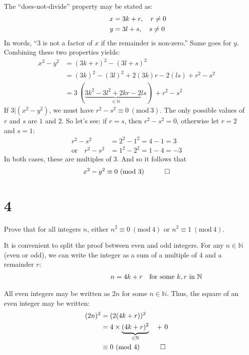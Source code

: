 \documentclass[12pt]{article}
\newcommand{\modulo}[1]{~(\mathrm{mod}~#1)}
\begin{document}
The ``does-not-divide'' property may be stated as:
\begin{align*}
x & = 3k + r, \mathrlap{\quad r\neq 0} \\
y & = 3l + s, \mathrlap{\quad s\neq 0}
\end{align*}
In words, ``$3$ is not a factor of $x$ if the remainder is non-zero.'' Same goes for $y$. Combining these two properties yields:
\begin{align*}
x^{2}-y^{2} 
 & = (3k + r)^{2} - (3l + s)^{2} \\
 & = (3k)^{2} - (3l)^{2} + 2(3k)r - 2(ls) + r^{2} - s^{2} \\
 & = 3 ~(\underbrace{3k^{2}-3l^{2}+2kr-2ls}_{\in\mathbb{N}})~ + r^{2} - s^{2}
\end{align*}
If $3|(x^{2}-y^{2})$, we must have $r^{2}-s^{2}\equiv0\modulo{3}$. The only possible values of $r$ and $s$ are $1$ and $2$. So let's see: if $r=s$, then $r^{2}-s^{2}=0$, otherwise let $r=2$ and $s=1$:
\begin{align*}
r^{2} - s^{2} 
  & = 2^{2} - 1^{2} = 4 - 1 = 3 \\
\text{or}\quad r^{2} - s^{2} 
  & = 1^{2} - 2^{2} = 1 - 4 = -3
\end{align*}
In both cases, these are multiples of $3$. And so it follows that
\begin{align*}
x^{2}-y^{2} \equiv 0 \modulo{3} \quad \qed 
\end{align*}

\clearpage
\section*{4}
\begin{question}
Prove that for all integers $n$, either $n^{2}\equiv 0\modulo{4}$ or $n^{2}\equiv 1\modulo{4}$.
\end{question}

It is convenient to split the proof between even and odd integers. For any $n\in\mathbb{N}$ (even or odd), we can write the integer as a sum of a multiple of $4$ and a remainder $r$:
\begin{align*}
n = 4k + r \mathrlap{\quad\text{for some}~k,r~\text{in}~\mathbb{N}}
\end{align*}

All even integers may be written as $2n$ for some $n\in\mathbb{N}$. Thus, the square of an even integer may be written:
\begin{align*}
(2n)^{2} 
  & = (2(4k + r))^{2} \\
  & = 4 \times \underbrace{(4k + r)^{2}}_{\in\mathbb{N}} \quad +~ 0 \\
  & \equiv 0\modulo{4} \quad \qed
\end{align*}
\end{document}
